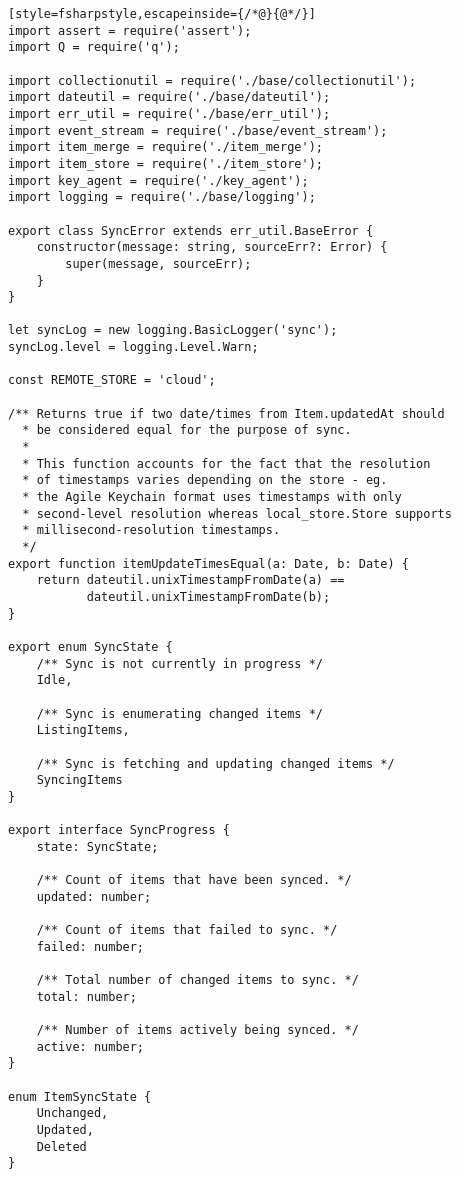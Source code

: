 
\begin{lstlisting}[style=fsharpstyle,escapeinside={/*@}{@*/}]
import assert = require('assert');
import Q = require('q');

import collectionutil = require('./base/collectionutil');
import dateutil = require('./base/dateutil');
import err_util = require('./base/err_util');
import event_stream = require('./base/event_stream');
import item_merge = require('./item_merge');
import item_store = require('./item_store');
import key_agent = require('./key_agent');
import logging = require('./base/logging');

export class SyncError extends err_util.BaseError {
	constructor(message: string, sourceErr?: Error) {
		super(message, sourceErr);
	}
}

let syncLog = new logging.BasicLogger('sync');
syncLog.level = logging.Level.Warn;

const REMOTE_STORE = 'cloud';

/** Returns true if two date/times from Item.updatedAt should
  * be considered equal for the purpose of sync.
  *
  * This function accounts for the fact that the resolution
  * of timestamps varies depending on the store - eg.
  * the Agile Keychain format uses timestamps with only
  * second-level resolution whereas local_store.Store supports
  * millisecond-resolution timestamps.
  */
export function itemUpdateTimesEqual(a: Date, b: Date) {
	return dateutil.unixTimestampFromDate(a) ==
	       dateutil.unixTimestampFromDate(b);
}

export enum SyncState {
	/** Sync is not currently in progress */
	Idle,

	/** Sync is enumerating changed items */
	ListingItems,

	/** Sync is fetching and updating changed items */
	SyncingItems
}

export interface SyncProgress {
	state: SyncState;

	/** Count of items that have been synced. */
	updated: number;

	/** Count of items that failed to sync. */
	failed: number;

	/** Total number of changed items to sync. */
	total: number;

	/** Number of items actively being synced. */
	active: number;
}

enum ItemSyncState {
	Unchanged,
	Updated,
	Deleted
}


\end{lstlisting}
